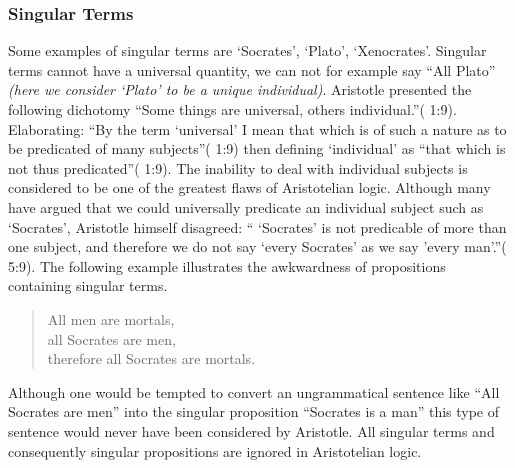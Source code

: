 \documentclass[12pt]{article}
\begin{document}
\subsubsection*{Singular Terms}
Some examples of singular terms are `Socrates', `Plato', `Xenocrates'.  Singular terms cannot have a universal quantity, we can not for example say ``All Plato'' \textit{(here we consider `Plato' to be a unique individual)}.  Aristotle presented the following dichotomy ``Some things are universal, others individual.''(\cite{AI} 1:9).  Elaborating: ``By the term `universal' I mean that which is of such a nature as to be predicated of many subjects''(\cite{AI} 1:9) then defining `individual' as ``that which is not thus predicated''(\cite{AI} 1:9).  The inability to deal with individual subjects is considered to be one of the greatest flaws of Aristotelian logic.  Although many have argued that we could universally predicate an individual subject such as `Socrates', Aristotle himself disagreed: `` `Socrates' is not predicable of more than one subject, and therefore we do not say `every Socrates' as we say 'every man'.''(\cite{AM} 5:9).  The following example illustrates the awkwardness of propositions containing singular terms.
\begin{quote}
\begin{center}
All men are mortals,\\
all Socrates are men,\\
therefore all Socrates are mortals.\\
\end{center}
\end{quote}
Although one would be tempted to convert an ungrammatical sentence like ``All Socrates are men'' into the singular proposition ``Socrates is a man'' this type of sentence would never have been considered by Aristotle.  All singular terms and consequently singular propositions are ignored in Aristotelian logic.
\end{document}

